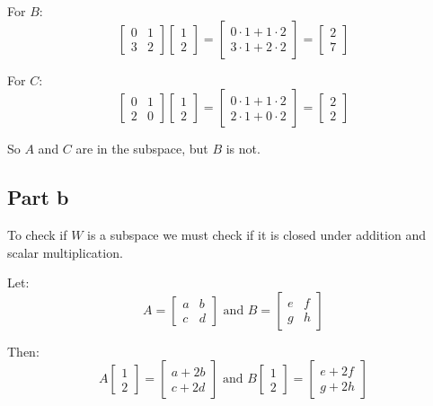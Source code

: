 For $B$:
\[
	\begin{bmatrix}
		0 & 1 \\
		3 & 2
	\end{bmatrix}\begin{bmatrix}
		1 \\
		2
	\end{bmatrix} =
	\begin{bmatrix}
		0\cdot 1 + 1\cdot 2 \\
		3\cdot 1 + 2\cdot 2
	\end{bmatrix} =
	\begin{bmatrix}
		2 \\
		7
	\end{bmatrix}
\]

For $C$:
\[
	\begin{bmatrix}
		0 & 1 \\
		2 & 0
	\end{bmatrix}\begin{bmatrix}
		1 \\
		2
	\end{bmatrix} =
	\begin{bmatrix}
		0\cdot 1 + 1\cdot 2 \\
		2\cdot 1 + 0\cdot 2
	\end{bmatrix} =
	\begin{bmatrix}
		2 \\
		2
	\end{bmatrix}
\]

So $A$ and $C$ are in the subspace, but $B$ is not.

\subsection{Part b}

To check if $W$ is a subspace we must check if it is closed under addition and scalar multiplication.

Let:
\[
	A = \begin{bmatrix}
		a & b \\
		c & d
	\end{bmatrix} \text{ and }
	B = \begin{bmatrix}
		e & f \\
		g & h
	\end{bmatrix}
\]

Then:
\[
	A\begin{bmatrix}
		1 \\
		2
	\end{bmatrix} = \begin{bmatrix}
		a + 2b \\
		c + 2d
	\end{bmatrix} \text{ and }
	B\begin{bmatrix}
		1 \\
		2
	\end{bmatrix} = \begin{bmatrix}
		e + 2f \\
		g + 2h
	\end{bmatrix}
\]


